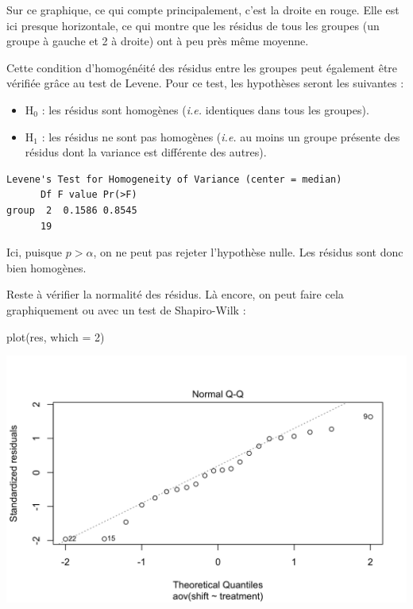 \documentclass[
  a4paper,
]{article}
\newenvironment{Shaded}{\begin{snugshade}}{\end{snugshade}}
\newcommand{\AttributeTok}[1]{\textcolor[rgb]{0.00,0.34,0.68}{#1}}
\newcommand{\DecValTok}[1]{\textcolor[rgb]{0.69,0.50,0.00}{#1}}
\newcommand{\FunctionTok}[1]{\textcolor[rgb]{0.39,0.29,0.61}{#1}}
\newcommand{\NormalTok}[1]{\textcolor[rgb]{0.12,0.11,0.11}{#1}}
\newcommand{\SpecialCharTok}[1]{\textcolor[rgb]{0.24,0.68,0.91}{#1}}
\providecommand{\tightlist}{%
  \setlength{\itemsep}{0pt}\setlength{\parskip}{0pt}}
\begin{document}
Sur ce graphique, ce qui compte principalement, c'est la droite en rouge. Elle est ici presque horizontale, ce qui montre que les résidus de tous les groupes (un groupe à gauche et 2 à droite) ont à peu près même moyenne.

Cette condition d'homogénéité des résidus entre les groupes peut également être vérifiée grâce au test de Levene. Pour ce test, les hypothèses seront les suivantes :

\begin{itemize}
\tightlist
\item
  H\(_0\) : les résidus sont homogènes (\emph{i.e.} identiques dans tous les groupes).
\item
  H\(_1\) : les résidus ne sont pas homogènes (\emph{i.e.} au moins un groupe présente des résidus dont la variance est différente des autres).
\end{itemize}

\begin{Shaded}
\end{Shaded}

\begin{verbatim}
Levene's Test for Homogeneity of Variance (center = median)
      Df F value Pr(>F)
group  2  0.1586 0.8545
      19               
\end{verbatim}

Ici, puisque \(p > \alpha\), on ne peut pas rejeter l'hypothèse nulle. Les résidus sont donc bien homogènes.

Reste à vérifier la normalité des résidus. Là encore, on peut faire cela graphiquement ou avec un test de Shapiro-Wilk :

\begin{Shaded}
\begin{Highlighting}[]
\FunctionTok{plot}\NormalTok{(res, }\AttributeTok{which =} \DecValTok{2}\NormalTok{)}
\end{Highlighting}
\end{Shaded}

\begin{center}\includegraphics[width=0.9\linewidth]{figure/unnamed-chunk-83-1} \end{center}
\end{document}
